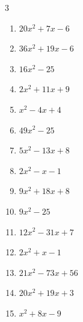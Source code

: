 \begin{multicols}{3}
\begin{enumerate}
  \item $20x^{2}+7x-6$

        \phantom{$=(5x-2)(4x+3)$}

  \item $36x^{2}+19x-6$

        \phantom{$=(9x-2)(4x+3)$}

  \item $16x^{2}-25$

        \phantom{$=(4x+5)(4x-5)$}

  \item $2x^{2}+11x+9$

        \phantom{$=(x+1)(2x+9)$}

  \item $x^{2}-4x+4$


\columnbreak %

  \item $49x^{2}-25$

        \phantom{$=(7x+5)(7x-5)$}

  \item $5x^{2}-13x+8$

        \phantom{$=(5x-8)(x-1)$}

  \item $2x^{2}-x-1$

        \phantom{$=(2x+1)(x-1)$}

  \item $9x^{2}+18x+8$

        \phantom{$=(3x+4)(3x+2)$}

  \item $9x^{2}-25$

        \phantom{$=(3x-5)(3x+5)$}

  \item $12x^{2}-31x+7$

        \phantom{$=(3x-7)(4x-1)$}

  \item $2x^{2}+x-1$

        \phantom{$=(x+1)(2x-1)$}

  \item $21x^{2}-73x+56$

        \phantom{$=(3x-7)(7x-8)$}

  \item $20x^{2}+19x+3$

        \phantom{$=(4x+3)(5x+1)$}

  \item $x^{2}+8x-9$


\end{enumerate}
\end{multicols}
